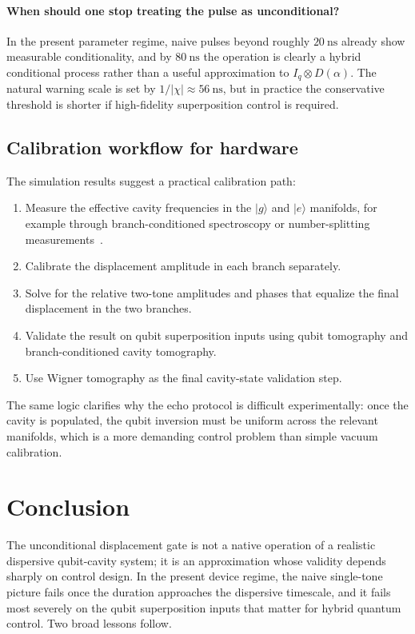 \documentclass[aps,pra,twocolumn,reprint,floatfix,amsmath,amssymb]{revtex4-2}
\begin{document}
\paragraph*{When should one stop treating the pulse as unconditional?}
In the present parameter regime, naive pulses beyond roughly \(\SI{20}{\nano\second}\) already show measurable conditionality, and by \(\SI{80}{\nano\second}\) the operation is clearly a hybrid conditional process rather than a useful approximation to \(I_q \otimes D(\alpha)\). The natural warning scale is set by \(1/|\chi| \approx \SI{56}{\nano\second}\), but in practice the conservative threshold is shorter if high-fidelity superposition control is required.

\subsection{Calibration workflow for hardware}

The simulation results suggest a practical calibration path:
\begin{enumerate}
  \item Measure the effective cavity frequencies in the \(|g\rangle\) and \(|e\rangle\) manifolds, for example through branch-conditioned spectroscopy or number-splitting measurements~\cite{schuster2007resolving}.
  \item Calibrate the displacement amplitude in each branch separately.
  \item Solve for the relative two-tone amplitudes and phases that equalize the final displacement in the two branches.
  \item Validate the result on qubit superposition inputs using qubit tomography and branch-conditioned cavity tomography.
  \item Use Wigner tomography as the final cavity-state validation step.
\end{enumerate}
The same logic clarifies why the echo protocol is difficult experimentally: once the cavity is populated, the qubit inversion must be uniform across the relevant manifolds, which is a more demanding control problem than simple vacuum calibration.

\section{Conclusion}
\label{sec:conclusion}

The unconditional displacement gate is not a native operation of a realistic dispersive qubit-cavity system; it is an approximation whose validity depends sharply on control design. In the present device regime, the naive single-tone picture fails once the duration approaches the dispersive timescale, and it fails most severely on the qubit superposition inputs that matter for hybrid quantum control. Two broad lessons follow.
\end{document}
